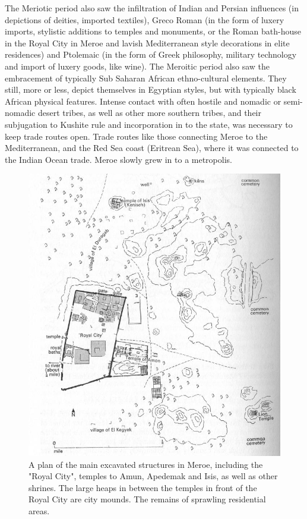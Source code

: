 \documentclass[a4paper,12pt]{scrreprt}
\begin{document}
The Meriotic period also saw the infiltration of Indian and Persian influences (in depictions of deities, imported textiles), Greco Roman (in the form of luxery imports, stylistic additions to temples and monuments, or the Roman bath-house in the Royal City in Meroe and lavish Mediterranean style decorations in elite residences) and Ptolemaic (in the form of Greek philosophy, military technology and import of luxery goods, like wine). The Meroitic period also saw the embracement of typically Sub Saharan African ethno-cultural elements. They still, more or less, depict themselves in Egyptian styles, but with typically black African physical features. Intense contact with often hostile and nomadic or semi-nomadic desert tribes, as well as other more southern tribes, and their subjugation to Kushite rule and incorporation in to the state, was necessary to keep trade routes open. Trade routes like those connecting Meroe to the Mediterranean, and the Red Sea coast (Eritrean Sea), where it was connected to the Indian Ocean trade. Meroe slowly grew in to a metropolis.

\begin{figure}[H]
	\centering
	\includegraphics[width=\textwidth]{img/plan_excavated_structures_meroe}
	\caption{A plan of the main excavated structures in Meroe, including the "Royal City", temples to Amun, Apedemak and Isis, as well as other shrines. The large heaps in between the temples in front of the Royal City are city mounds. The remains of sprawling residential areas.}
\end{figure}
\end{document}
